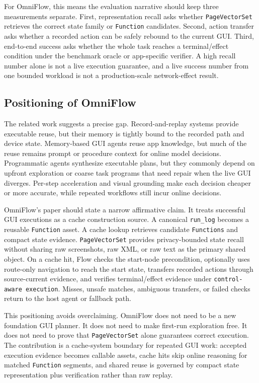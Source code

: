 \documentclass[sigplan,10pt]{acmart}
\newcommand{\sysname}{OmniFlow\xspace}
\begin{document}
For \sysname, this means the evaluation narrative should keep three measurements
separate. First, representation recall asks whether \texttt{PageVectorSet}
retrieves the correct state family or \texttt{Function} candidates. Second,
action transfer asks whether a recorded action can be safely rebound to the
current GUI. Third, end-to-end success asks whether the whole task reaches a
terminal/effect condition under the benchmark oracle or app-specific verifier. A
high recall number alone is not a live execution guarantee, and a live success
number from one bounded workload is not a production-scale network-effect
result.

\subsection{Positioning of \sysname}

The related work suggests a precise gap. Record-and-replay systems provide
executable reuse, but their memory is tightly bound to the recorded path and
device state. Memory-based GUI agents reuse app knowledge, but much of the reuse
remains prompt or procedure context for online model decisions. Programmatic
agents synthesize executable plans, but they commonly depend on upfront
exploration or coarse task programs that need repair when the live GUI diverges.
Per-step acceleration and visual grounding make each decision cheaper or more
accurate, while repeated workflows still incur online decisions.

\sysname's paper should state a narrow affirmative claim. It treats successful
GUI executions as a cache construction source. A canonical \texttt{run\_log}
becomes a reusable \texttt{Function} asset. A cache lookup retrieves candidate
\texttt{Functions} and compact state evidence. \texttt{PageVectorSet} provides
privacy-bounded state recall without sharing raw screenshots, raw XML, or raw
text as the primary shared object. On a cache hit, Flow checks the start-node
precondition, optionally uses route-only navigation to reach the start state,
transfers recorded actions through source-current evidence, and verifies
terminal/effect evidence under \texttt{control-aware execution}. Misses, unsafe
matches, ambiguous transfers, or failed checks return to the host agent or
fallback path.

This positioning avoids overclaiming. \sysname does not need to be a new
foundation GUI planner. It does not need to make first-run exploration free. It
does not need to prove that \texttt{PageVectorSet} alone guarantees correct
execution. The contribution is a cache-system boundary for repeated GUI work:
accepted execution evidence becomes callable assets, cache hits skip online
reasoning for matched \texttt{Function} segments, and shared reuse is governed
by compact state representation plus verification rather than raw replay.
\end{document}
